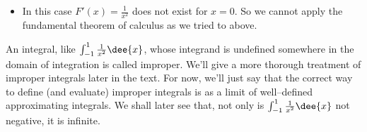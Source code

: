\begin{eg}
\begin{itemize}
\item In this case $F'(x)=\frac{1}{x^2}$ does not exist for $x=0$. So we cannot apply the
fundamental theorem of calculus as we tried to above.
\end{itemize}
An integral, like $\int_{-1}^1\frac{1}{x^2}\dee{x}$, whose integrand
is undefined somewhere in the domain of integration is called
improper. We'll give a more thorough treatment of improper integrals later in the text.
For now, we'll just say that the correct way to define (and evaluate) improper integrals
is as a limit of well--defined approximating integrals. We shall later see that, not only
is $\int_{-1}^1\frac{1}{x^2}\dee{x}$ not negative, it is infinite.
\begin{comment}
For completeness we'll show how to evaluate this integral by sneaking up on the point of
discontinuity in the interval of integration. As noted above, we will give a fuller
explanation of such integrals later in the text.
\begin{itemize}
 \item Rather than evaluating the integral directly, we will approximate the integral
using definite integrals on intervals that avoid the discontinuity. In the current
example, the original domain of integration is $-1\le x\le 1$. The
domains of integration of the approximating integrals exclude from $[-1,1]$ small
intervals around $x=0$.
\item The shaded area in the figure below illustrates a typical approximating
integral, whose domain of integration consists of the original domain of
integration, $[-1,1]$, but with the interval $[-t,T]$ excluded.
\begin{efig}
\begin{center}
    \texttt{[image: boobyTrap]}
\end{center}
\end{efig}
The full domain of integration is only recovered in the limit
$t,T\rightarrow 0$.


\end{comment}
\end{eg}
